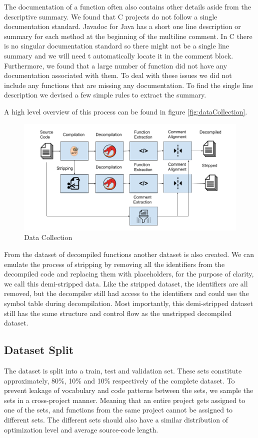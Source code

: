 The documentation of a function often also contains other details aside from the descriptive summary. We found that C projects do not follow a single documentation standard. Javadoc for Java has a short one line description or summary for each method at the beginning of the multiline comment. In C there is no singular documentation standard so there might not be a single line summary and we will need t automatically locate it in the comment block. 
Furthermore, we found that a large number of function did not have any documentation associated with them. To deal with these issues we did not include any functions that are missing any documentation. To find the single line description we devised a few simple rules to extract the summary.

A high level overview of this process can be found in figure \ref{fig:dataCollection}.

\label{fig:dataCollection}
\begin{figure}[!h]
  \centering
  \includegraphics[width=\linewidth]{img/dataCollection.png}
  \caption{Data Collection}
\end{figure}

From the dataset of decompiled functions another dataset is also created. We can emulate the process of stripping by removing all the identifiers from the decompiled code and replacing them with placeholders, for the purpose of clarity, we call this demi-stripped data. Like the stripped dataset, the identifiers are all removed, but the decompiler still had access to the identifiers and could use the symbol table during decompilation. Most importantly, this demi-stripped dataset still has the same structure and control flow as the unstripped decompiled dataset.

\subsection{Dataset Split}
The dataset is split into a train, test and validation set. These sets constitute approximately, 80\%, 10\% and 10\% respectively\cite{recommend_summarization} of the complete dataset. To prevent leakage of vocabulary and code patterns between the sets, we sample the sets in a cross-project manner. Meaning that an entire project gets assigned to one of the sets, and functions from the same project cannot be assigned to different sets. The different sets should also have a similar distribution of optimization level and average source-code length.

